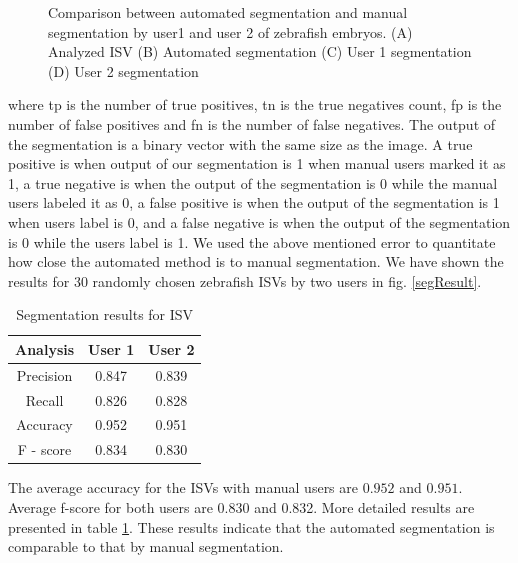\begin{figure}[H]
\begin{center}
  \end{center}
  \caption[ISV segmented images]{Comparison between automated segmentation and manual segmentation by user1 and user 2 of zebrafish embryos. (A) Analyzed ISV (B) Automated segmentation (C) User 1 segmentation (D) User 2 segmentation}
 \label{isvseg}
\end{figure}


where tp is the number of true positives, tn is the true negatives count, fp is the number of false positives and fn is the number of false negatives. The output of the segmentation is a binary vector with the same size as the image. A true positive is when output of
our segmentation is 1 when manual users marked it as 1, a true negative is when the output of the segmentation is 0 while the manual users labeled it as 0, a false positive is when the output of the segmentation is 1 when users label is 0, and a false negative is when the output of the segmentation is 0 while the users label is 1. We used the above mentioned error to quantitate how close the automated method is to manual segmentation. We have shown the results for 30 randomly chosen zebrafish ISVs by two users in fig. \ref{segResult}. 


\begin{table}[htb] 
\begin{center}
	\caption{Segmentation results for ISV} 
	
    \begin{tabular}{| c | c | c |}
    \hline\hline
    \textbf{Analysis} & \textbf{User 1}  & \textbf{User 2} \\ \hline \hline
		Precision & 0.847 & 0.839  \\ \hline
		Recall & 0.826 & 0.828  \\ \hline
		Accuracy & 0.952 & 0.951  \\ \hline
		F - score & 0.834 & 0.830  \\ \hline
    \end{tabular}
		\label{table:segRes} 
\end{center}
\end{table}

The average accuracy for the ISVs with manual users are $0.952$ and $0.951$. Average f-score for both users are 0.830 and 0.832. More detailed results are presented in table \ref{table:segRes}. These results indicate that the automated segmentation is comparable to that by manual segmentation. 


